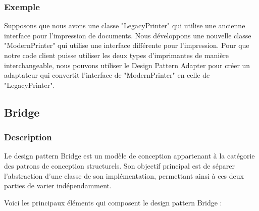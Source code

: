 \documentclass[french]{article}
\begin{document}
\subsubsection{Exemple}

Supposons que nous avons une classe "LegacyPrinter" qui utilise une ancienne interface pour l'impression de documents. Nous développons une nouvelle classe "ModernPrinter" qui utilise une interface différente pour l'impression. Pour que notre code client puisse utiliser les deux types d'imprimantes de manière interchangeable, nous pouvons utiliser le Design Pattern Adapter pour créer un adaptateur qui convertit l'interface de "ModernPrinter" en celle de "LegacyPrinter".





\subsection{Bridge}

\subsubsection{Description}

Le design pattern Bridge est un modèle de conception appartenant à la catégorie des patrons de conception structurels. Son objectif principal est de séparer l'abstraction d'une classe de son implémentation, permettant ainsi à ces deux parties de varier indépendamment.

Voici les principaux éléments qui composent le design pattern Bridge :
\end{document}
